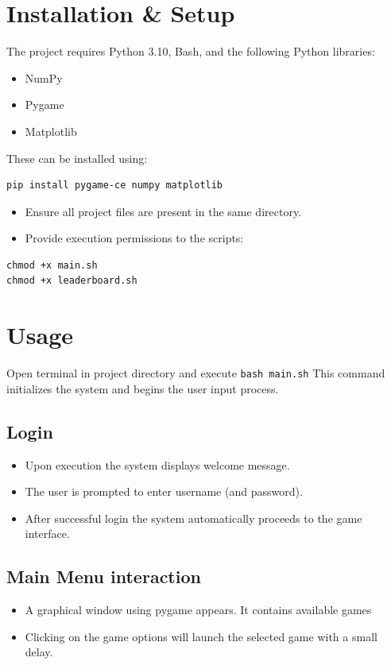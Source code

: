 \documentclass[12pt]{article}
\begin{document}
\section{Installation \& Setup}
The project requires Python 3.10, Bash, and the following Python libraries:
\begin{itemize}
    \item NumPy
    \item Pygame
    \item Matplotlib
\end{itemize}

These can be installed using:
\begin{verbatim}
pip install pygame-ce numpy matplotlib
\end{verbatim}

\begin{itemize}
    \item Ensure all project files are present in the same directory.
    \item Provide execution permissions to the scripts:
\end{itemize}

\begin{verbatim}
chmod +x main.sh
chmod +x leaderboard.sh
\end{verbatim}

\section{Usage}
Open terminal in project directory and execute
\texttt{bash main.sh}
This command initializes the system and begins the user input process.
\subsection{Login}
\begin{itemize}
    \item Upon execution the system displays welcome message.
    \item The user is prompted to enter username (and password).
    \item After successful login the system automatically proceeds to the game interface.
\end{itemize}
\subsection{Main Menu interaction}
\begin{itemize}
    \item A graphical window using pygame appears. It contains available games
    \item Clicking on the game options will launch the selected game with a small delay.
\end{itemize}
\end{document}
